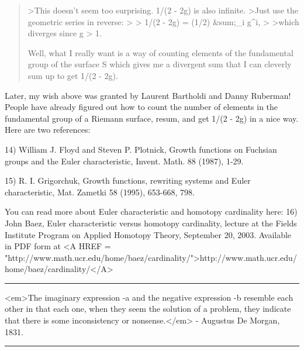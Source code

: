 \begin{quote}
>This doesn't seem too surprising.  1/(2 - 2g) is also infinite.
>Just use the geometric series in reverse:
>
>                  1/(2 - 2g) = (1/2) &sum;_{i} g^{i}, 
>
>which diverges since g > 1.
$$
    

Well, what I really want is a way of counting elements of the fundamental
group of the surface S which gives me a divergent sum that I can cleverly
sum up to get 1/(2 - 2g).  

\end{quote}

Later, my wish above was granted by Laurent Bartholdi and Danny Ruberman!
People have already figured out how to count the number of elements
in the fundamental group of a Riemann surface, resum, and get 1/(2 - 2g) 
in a nice way.  Here are two references:

14) William J. Floyd and Steven P. Plotnick, Growth functions on 
Fuchsian groups and the Euler characteristic, Invent. Math. 88
(1987), 1-29.

15) R. I. Grigorchuk, Growth functions, rewriting systems and Euler 
characteristic, Mat. Zametki 58 (1995), 653-668, 798.

You can read more about Euler characteristic and homotopy cardinality
here:
16) John Baez, Euler characteristic versus homotopy cardinality, 
lecture at the Fields Institute Program on Applied Homotopy Theory, 
September 20, 2003.  Available in PDF form at <A HREF = "http://www.math.ucr.edu/home/baez/cardinality/">http://www.math.ucr.edu/home/baez/cardinality/</A>






 \par\noindent\rule{\textwidth}{0.4pt}

<em>The imaginary expression \sqrt -a and the negative expression
-b resemble each other in that each one, when they seem the solution
of a problem, they indicate that there is some inconsistency or
nonsense.</em> - Augustus De Morgan, 1831.
\par\noindent\rule{\textwidth}{0.4pt}

